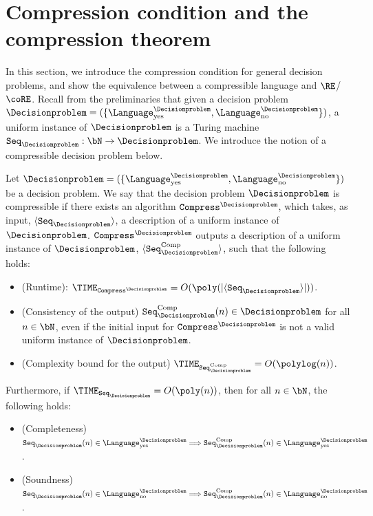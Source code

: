 


\section{Compression condition and the compression theorem} \label{sec:Compression}

In this section, we introduce the compression condition for general decision problems, and show the equivalence between a compressible language and $\RE$/$\coRE$. Recall from the preliminaries that given a decision problem $\Decisionproblem = (\{\Language_{\text{yes}}^{\Decisionproblem}, \Language_{\text{no}}^{\Decisionproblem}\})$, a uniform instance of $\Decisionproblem$ is a Turing machine $\texttt{Seq}_{\Decisionproblem}: \bN \rightarrow \Decisionproblem$. We introduce the notion of a compressible decision problem below.
\begin{definition}\label{def:compressibleproblem}
	Let $\Decisionproblem = (\{\Language_{\text{yes}}^{\Decisionproblem}, \Language_{\text{no}}^{\Decisionproblem}\})$ be a decision problem. We say that the decision problem $\Decisionproblem$ is compressible if there exists an algorithm $\texttt{Compress}^{\Decisionproblem}$, which takes, as input, $\langle \texttt{Seq}_{\Decisionproblem}\rangle$, a description of a uniform instance of $\Decisionproblem$. $\texttt{Compress}^{\Decisionproblem}$ outputs a description of a uniform instance of $\Decisionproblem$, $\langle\texttt{Seq}^{\text{Comp}}_{\Decisionproblem}\rangle$, such that the following holds:
	\begin{itemize}
		\item (Runtime): $\TIME_{\texttt{Compress}^{\Decisionproblem}} = O(\poly(|\langle\texttt{Seq}_{\Decisionproblem}\rangle|))$. 
		\item (Consistency of the output) $\texttt{Seq}^{\text{Comp}}_{\Decisionproblem}(n) \in \Decisionproblem$ for all $n \in \bN$, even if the initial input for $\texttt{Compress}^{\Decisionproblem}$ is not a valid uniform instance of $\Decisionproblem$. 
		\item (Complexity bound for the output) $\TIME_{\texttt{Seq}^{\text{Comp}}_{\Decisionproblem}} = O(\polylog(n))$. 
	\end{itemize}
	Furthermore, if $\TIME_{\texttt{Seq}_{\Decisionproblem}} = O(\poly(n))$, then for all $n \in \bN$, the following holds:
	\begin{itemize}
		\item (Completeness) $\texttt{Seq}_{\Decisionproblem}(n) \in\Language_{\text{yes}}^{\Decisionproblem} \Longrightarrow \texttt{Seq}_{\Decisionproblem}^{\text{Comp}}(n) \in\Language_{\text{yes}}^{\Decisionproblem}$.
		\item (Soundness) $\texttt{Seq}_{\Decisionproblem}(n) \in\Language_{\text{no}}^{\Decisionproblem} \Longrightarrow \texttt{Seq}_{\Decisionproblem}^{\text{Comp}}(n) \in\Language_{\text{no}}^{\Decisionproblem}$.
	\end{itemize}
\end{definition}
